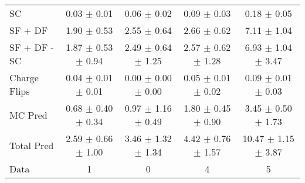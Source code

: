 \begin{tabular}{l|cccc}
                                 SC &  0.03 $\pm$  0.01 &  0.06 $\pm$  0.02 &  0.09 $\pm$  0.03 &  0.18 $\pm$  0.05 \\
                            SF + DF &  1.90 $\pm$  0.53 &  2.55 $\pm$  0.64 &  2.66 $\pm$  0.62 &  7.11 $\pm$  1.04 \\
\hline
                       SF + DF - SC &  1.87 $\pm$  0.53 $\pm$  0.94 &  2.49 $\pm$  0.64 $\pm$  1.25 &  2.57 $\pm$  0.62 $\pm$  1.28 &  6.93 $\pm$  1.04 $\pm$  3.47 \\
\hline\hline
                       Charge Flips &  0.04 $\pm$  0.01 $\pm$  0.01 &  0.00 $\pm$  0.00 $\pm$  0.00 &  0.05 $\pm$  0.01 $\pm$  0.02 &  0.09 $\pm$  0.01 $\pm$  0.03 \\
\hline
                            MC Pred &  0.68 $\pm$  0.40 $\pm$  0.34 &  0.97 $\pm$  1.16 $\pm$  0.49 &  1.80 $\pm$  0.45 $\pm$  0.90 &  3.45 $\pm$  0.50 $\pm$  1.73 \\
\hline
                         Total Pred &  2.59 $\pm$  0.66 $\pm$  1.00 &  3.46 $\pm$  1.32 $\pm$  1.34 &  4.42 $\pm$  0.76 $\pm$  1.57 & 10.47 $\pm$  1.15 $\pm$  3.87 \\
\hline\hline
                               Data &     1 &     0 &     4 &     5 \\
\hline\hline
\end{tabular}

